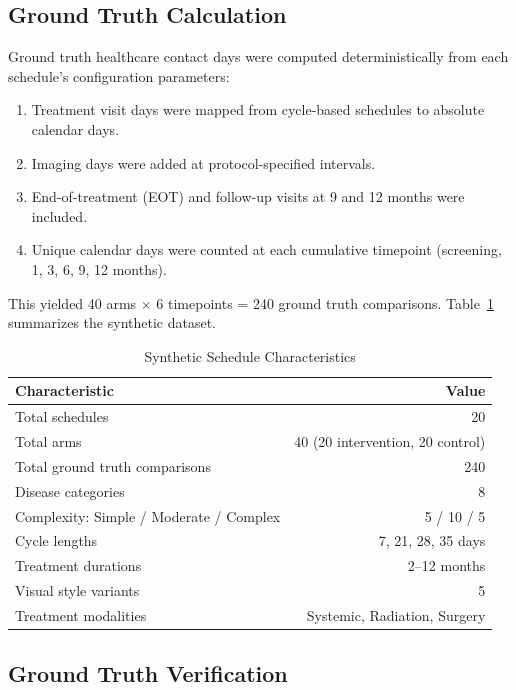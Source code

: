\documentclass[11pt]{article}
\begin{document}
\subsection{Ground Truth Calculation}

Ground truth healthcare contact days were computed deterministically from each schedule's configuration parameters:
\begin{enumerate}[leftmargin=*]
    \item Treatment visit days were mapped from cycle-based schedules to absolute calendar days.
    \item Imaging days were added at protocol-specified intervals.
    \item End-of-treatment (EOT) and follow-up visits at 9 and 12 months were included.
    \item Unique calendar days were counted at each cumulative timepoint (screening, 1, 3, 6, 9, 12 months).
\end{enumerate}

This yielded 40 arms $\times$ 6 timepoints = 240 ground truth comparisons. Table~\ref{tab:synthetic_characteristics} summarizes the synthetic dataset.

\begin{table}[H]
\centering
\caption{Synthetic Schedule Characteristics}
\label{tab:synthetic_characteristics}
\begin{tabular}{lr}
\toprule
\textbf{Characteristic} & \textbf{Value} \\
\midrule
Total schedules & 20 \\
Total arms & 40 (20 intervention, 20 control) \\
Total ground truth comparisons & 240 \\
Disease categories & 8 \\
Complexity: Simple / Moderate / Complex & 5 / 10 / 5 \\
Cycle lengths & 7, 21, 28, 35 days \\
Treatment durations & 2--12 months \\
Visual style variants & 5 \\
Treatment modalities & Systemic, Radiation, Surgery \\
\bottomrule
\end{tabular}
\end{table}

\subsection{Ground Truth Verification}
\end{document}
